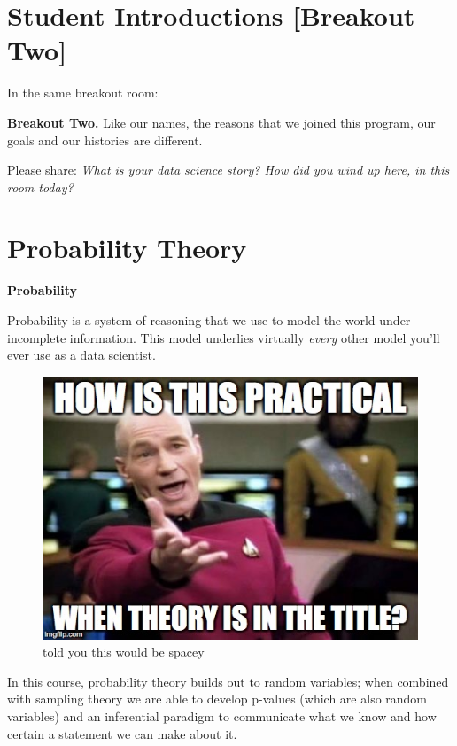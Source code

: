 \documentclass[
]{book}
\theoremstyle{definition}
\theoremstyle{definition}
\theoremstyle{definition}
\theoremstyle{definition}
\theoremstyle{remark}
\begin{document}
\hypertarget{student-introductions-breakout-two}{%
\section{Student Introductions {[}Breakout Two{]}}\label{student-introductions-breakout-two}}

In the same breakout room:

\begin{breakout}
\textbf{Breakout Two.}
Like our names, the reasons that we joined this program, our goals and our histories are different.

Please share: \emph{What is your data science story? How did you wind up here, in this room today?}

\end{breakout}

\hypertarget{probability-theory}{%
\section{Probability Theory}\label{probability-theory}}

\textbf{Probability}

Probability is a system of reasoning that we use to model the world under incomplete information. This model underlies virtually \emph{every} other model you'll ever use as a data scientist.

\begin{figure}
\centering
\includegraphics{./images/picard.jpg}
\caption{told you this would be spacey}
\end{figure}

In this course, probability theory builds out to random variables; when combined with sampling theory we are able to develop p-values (which are also random variables) and an inferential paradigm to communicate what we know and how certain a statement we can make about it.
\end{document}
